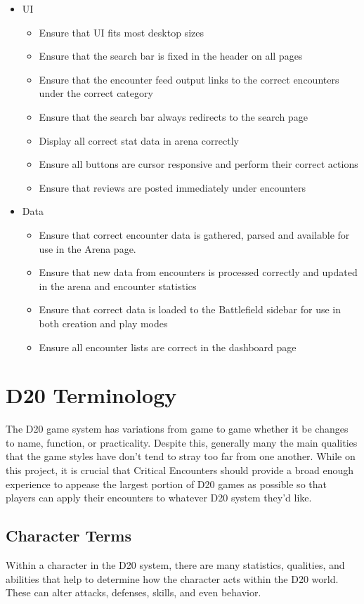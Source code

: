 \documentclass[12pt,a4paper]{report}
\begin{document}
\begin{itemize}
	\item{UI}
		\begin{itemize}
			\item Ensure that UI fits most desktop sizes 
			\item Ensure that the search bar is fixed in the header on all pages
			\item Ensure that the encounter feed output links to the correct encounters under the correct category
			\item Ensure that the search bar always redirects to the search page
			\item Display all correct stat data in arena correctly
			\item Ensure all buttons are cursor responsive and perform their correct actions
			\item Ensure that reviews are posted immediately under encounters
		\end{itemize}
	\item Data
		\begin{itemize}
			\item Ensure that correct encounter data is gathered, parsed and available for use in the Arena page.
			\item Ensure that new data from encounters is processed correctly and updated in the arena and encounter statistics
			\item Ensure that correct data is loaded to the Battlefield sidebar for use in both creation and play modes
			\item Ensure all encounter lists are correct in the dashboard page
		\end{itemize}
\end{itemize}

\section{D20 Terminology}
		The D20 game system has variations from game to game whether it be changes to name, function, or practicality. Despite this, generally many the main qualities that the game styles have don't tend to stray too far from one another. While on this project, it is crucial that Critical Encounters should provide a broad enough experience to appease the largest portion of D20 games as possible so that players can apply their encounters to whatever D20 system they'd like. 
		\subsection{Character Terms}
			Within a character in the D20 system, there are many statistics, qualities, and abilities that help to determine how the character acts within the D20 world. These can alter attacks, defenses, skills, and even behavior.
\end{document}

